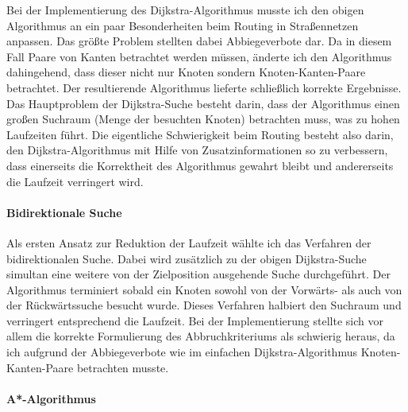 \documentclass[a4paper]{scrartcl}
\begin{document}
Bei der Implementierung des Dijkstra-Algorithmus musste ich den obigen Algorithmus an ein paar Besonderheiten beim Routing in Straßennetzen anpassen. Das größte Problem stellten dabei Abbiegeverbote dar. Da in diesem Fall Paare von Kanten betrachtet werden müssen, änderte ich den Algorithmus dahingehend, dass dieser nicht nur Knoten sondern Knoten-Kanten-Paare betrachtet. Der resultierende Algorithmus lieferte schließlich korrekte Ergebnisse. 
\\
 Das Hauptproblem der Dijkstra-Suche besteht darin, dass der Algorithmus einen großen Suchraum (Menge der besuchten Knoten) betrachten muss, was zu hohen Laufzeiten führt. Die eigentliche Schwierigkeit beim Routing besteht also darin, den Dijkstra-Algorithmus mit Hilfe von Zusatzinformationen so zu verbessern, dass einerseits die Korrektheit des Algorithmus gewahrt bleibt und andererseits die Laufzeit verringert wird. 

\paragraph{Bidirektionale Suche}
\label{sec:bidirektionale-suche}

Als ersten Ansatz zur Reduktion der Laufzeit wählte ich das Verfahren der bidirektionalen Suche. Dabei wird zusätzlich zu der obigen Dijkstra-Suche simultan eine weitere von der Zielposition ausgehende Suche durchgeführt. Der Algorithmus terminiert sobald ein Knoten sowohl von der Vorwärts- als auch von der Rückwärtssuche besucht wurde. Dieses Verfahren halbiert den Suchraum und verringert entsprechend die Laufzeit. Bei der Implementierung stellte sich vor allem die korrekte Formulierung des Abbruchkriteriums als schwierig heraus, da ich aufgrund der Abbiegeverbote wie im einfachen Dijkstra-Algorithmus Knoten-Kanten-Paare betrachten musste. 

\paragraph{ A*-Algorithmus}
\label{sec:eins-von-heur}
\end{document}
